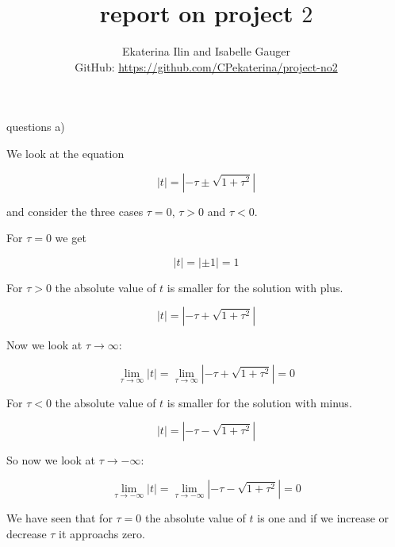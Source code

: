 \documentclass[11pt,a4wide]{article}
\begin{document}
\title{report on project $2$}
\author{Ekaterina Ilin and Isabelle Gauger\\GitHub: \url{https://github.com/CPekaterina/project-no2}
}
\maketitle
\tableofcontents
\newpage

questions a)

We look at the equation

\begin{equation}
\left|t\right| = \left|-\tau\pm\sqrt{1+\tau^2}\right|
\end{equation}

and consider the three cases $\tau=0$, $\tau>0$ and $\tau<0$.

For $\tau=0$ we get

\begin{equation}
\left|t\right| = \left|\pm1\right| = 1
\end{equation}

For $\tau>0$ the absolute value of $t$ is smaller for the solution with plus.  

\begin{equation}
\left|t\right| = \left|-\tau+\sqrt{1+\tau^2}\right|
\end{equation}

Now we look at $\tau\rightarrow\infty$:   

\begin{equation}  
\lim\limits_{\tau \rightarrow \infty}{\left|t\right|}=\lim\limits_{\tau \rightarrow \infty}{\left|-\tau+\sqrt{1+\tau^2}\right|}=0  
\end{equation}

For $\tau<0$ the absolute value of $t$ is smaller for the solution with minus.

\begin{equation}
\left|t\right| = \left|-\tau-\sqrt{1+\tau^2}\right|
\end{equation}

So now we look at $\tau\rightarrow-\infty$:

\begin{equation}
\lim\limits_{\tau \rightarrow -\infty}{\left|t\right|}=\lim\limits_{\tau \rightarrow -\infty}{\left|-\tau-\sqrt{1+\tau^2}\right|}=0  
\end{equation}

We have seen that for $\tau=0$ the absolute value of $t$ is one and if we increase or decrease $\tau$ it approachs zero.
\end{document}
